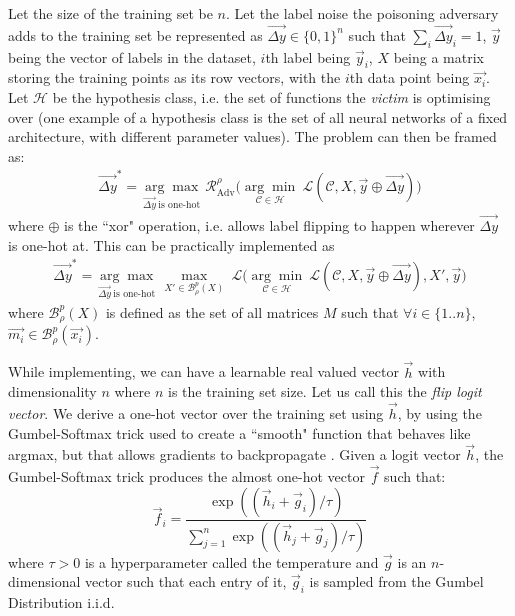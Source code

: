 \documentclass{ociamthesis}
\begin{document}
Let the size of the training set be $n$. Let the label noise the poisoning
adversary adds to the training set be represented as $\vec{\Delta y} \in \{0,
1\}^{n}$ such that $\sum_i \vec{\Delta y}_i = 1$, $\vec{y}$ being the vector of
labels in the dataset, $i$th label being $\vec{y}_i$, $X$ being a matrix storing
the training points as its row vectors, with the $i$th data point being
$\vec{x_i}$. Let $\mathcal{H}$ be the hypothesis class, i.e. the set of
functions the \emph{victim} is optimising over (one example of a hypothesis
class is the set of all neural networks of a fixed architecture, with different
parameter values). The problem can then be framed as:
\begin{equation}
    \label{eq:optimization}
    \begin{split}
    \vec{\Delta y}^*
    =
    {\underset{\vec{\Delta y}~\text{is one-hot}}
    {\arg\max}}~
    \mathcal{R}_{\text{Adv}}^{\rho}
    \biggl (
        \underset{\mathcal{C} \in \mathcal{H}}{\arg\min}~
        \mathcal{L}(\mathcal{C}, X, \vec{y} \oplus \vec{\Delta y})
    \biggr )
    \end{split}
\end{equation}
where $\oplus$ is the ``xor" operation, i.e. allows label flipping to happen
wherever $\vec{\Delta y}$ is one-hot at. This can be practically implemented as
\begin{equation}
    \label{eq:optimization-prac}
    \begin{split}
    \vec{\Delta y}^*
    =
    {\underset{\vec{\Delta y}~\text{is one-hot}}
    {\arg\max}}~
    \underset{X' \in \mathcal{B}_\rho^{p}(X)}{\max}~\mathcal{L} \biggl(
    \underset{\mathcal{C} \in \mathcal{H}}{\arg\min}~
    \mathcal{L}(\mathcal{C}, X, \vec{y} \oplus \vec{\Delta y}),
    X', \vec{y}
    \biggr)
    \end{split}
\end{equation}
where $\mathcal{B}_\rho^{p}(X)$ is defined as the set of all matrices $M$ such
that $\forall i \in \{1..n\}$, $\vec{m_i} \in \mathcal{B}_\rho^{p}(\vec{x_i})$.


While implementing, we can have a learnable real valued vector $\vec{h}$ with
dimensionality $n$ where $n$ is the training set size. Let us call this the
\emph{flip logit vector}. We derive a one-hot vector over the training set using
$\vec{h}$, by using the Gumbel-Softmax trick used to create a ``smooth" function
that behaves like argmax, but that allows gradients to backpropagate
\citep{DBLP:conf/iclr/MaddisonMT17}. Given a logit vector $\vec{h}$, the
Gumbel-Softmax trick produces the almost one-hot vector $\vec{f}$ such that:
\begin{equation*}
    \vec{f}_i = \frac{\exp((\vec{h}_i + \vec{g}_i)/\tau)}
        {\sum_{j=1}^n \exp((\vec{h}_j + \vec{g}_j)/\tau)}
\end{equation*}
where $\tau > 0$ is a hyperparameter called the temperature and $\vec{g}$ is an
$n$-dimensional vector such that each entry of it, $\vec{g}_i$ is sampled from
the  Gumbel Distribution i.i.d.
\end{document}

